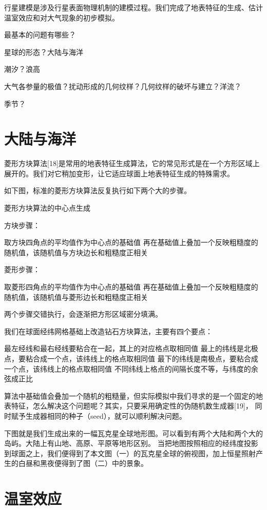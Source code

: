 \documentclass[a4paper,10.5pt]{book}
\begin{document}
行星建模是涉及行星表面物理机制的建模过程。我们完成了地表特征的生成、估计温室效应和对大气现象的初步模拟。

最基本的问题有哪些？

星球的形态？大陆与海洋

潮汐？浪高

大气各参量的极值？扰动形成的几何纹样？几何纹样的破坏与建立？洋流？

季节？

\section{大陆与海洋}

菱形方块算法[18]是常用的地表特征生成算法，它的常见形式是在一个方形区域上展开的。我们对它稍加变形，让它适应球面上地表特征生成的特殊需求。

如下图，标准的菱形方块算法反复执行如下两个大的步骤。


菱形方块算法的中心点生成

方块步骤：

取方块四角点的平均值作为中心点的基础值
再在基础值上叠加一个反映粗糙度的随机值，该随机值与方块边长和粗糙度正相关

菱形步骤：

取菱形四角点的平均值作为中心点的基础值
再在基础值上叠加一个反映粗糙度的随机值，该随机值与菱形边长和粗糙度正相关

两个步骤交错执行，会逐渐把方形区域密分填满。

我们在球面经纬网格基础上改造钻石方块算法，主要有四个要点：

最左经线和最右经线要粘合在一起，其上的对应格点取相同值
最上的纬线是北极点，要粘合成一个点，该纬线上的格点取相同值
最下的纬线是南极点，要粘合成一个点，该纬线上的格点取相同值
不同纬线上格点的间隔长度不等，与纬度的余弦成正比

算法中基础值会叠加一个随机的粗糙量，但实际模拟中我们寻求的是一个固定的地表特征，怎么解决这个问题呢？其实，只要采用确定性的伪随机数生成器[19]，
同时赋予生成器相同的种子（seed），就可以顺利解决问题。

下图就是我们生成出来的一幅瓦克星全球地形图。可以看到有两个大陆和两个大的岛屿。大陆上有山地、高原、平原等地形区别。
当把地图按照相应的经纬度投影到球面之上，我们便得到了本文图（一）的瓦克星全球的俯视图，加上恒星照射产生的白昼和黑夜便得到了图（二）中的景象。

\section{温室效应}
\end{document}
